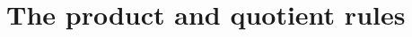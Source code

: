 \section{The product and quotient rules} \label{S:2.3.ProdQuot}



\newpage



\newpage



\newpage



\newpage